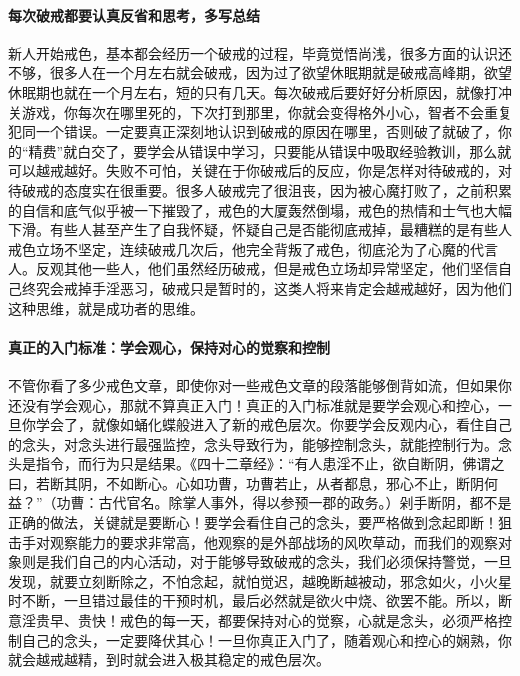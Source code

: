 \paragraph{每次破戒都要认真反省和思考，多写总结}

新人开始戒色，基本都会经历一个破戒的过程，毕竟觉悟尚浅，很多方面的认识还不够，很多人在一个月左右就会破戒，因为过了欲望休眠期就是破戒高峰期，欲望休眠期也就在一个月左右，短的只有几天。每次破戒后要好好分析原因，就像打冲关游戏，你每次在哪里死的，下次打到那里，你就会变得格外小心，智者不会重复犯同一个错误。一定要真正深刻地认识到破戒的原因在哪里，否则破了就破了，你的“精费”就白交了，要学会从错误中学习，只要能从错误中吸取经验教训，那么就可以越戒越好。失败不可怕，关键在于你破戒后的反应，你是怎样对待破戒的，对待破戒的态度实在很重要。很多人破戒完了很沮丧，因为被心魔打败了，之前积累的自信和底气似乎被一下摧毁了，戒色的大厦轰然倒塌，戒色的热情和士气也大幅下滑。有些人甚至产生了自我怀疑，怀疑自己是否能彻底戒掉，最糟糕的是有些人戒色立场不坚定，连续破戒几次后，他完全背叛了戒色，彻底沦为了心魔的代言人。反观其他一些人，他们虽然经历破戒，但是戒色立场却异常坚定，他们坚信自己终究会戒掉手淫恶习，破戒只是暂时的，这类人将来肯定会越戒越好，因为他们这种思维，就是成功者的思维。

\paragraph{真正的入门标准：学会观心，保持对心的觉察和控制}

不管你看了多少戒色文章，即使你对一些戒色文章的段落能够倒背如流，但如果你还没有学会观心，那就不算真正入门！真正的入门标准就是要学会观心和控心，一旦你学会了，就像如蛹化蝶般进入了新的戒色层次。你要学会反观内心，看住自己的念头，对念头进行最强监控，念头导致行为，能够控制念头，就能控制行为。念头是指令，而行为只是结果。《四十二章经》：“有人患淫不止，欲自断阴，佛谓之曰，若断其阴，不如断心。心如功曹，功曹若止，从者都息，邪心不止，断阴何益？”（功曹：古代官名。除掌人事外，得以参预一郡的政务。）剁手断阴，都不是正确的做法，关键就是要断心！要学会看住自己的念头，要严格做到念起即断！狙击手对观察能力的要求非常高，他观察的是外部战场的风吹草动，而我们的观察对象则是我们自己的内心活动，对于能够导致破戒的念头，我们必须保持警觉，一旦发现，就要立刻断除之，不怕念起，就怕觉迟，越晚断越被动，邪念如火，小火星时不断，一旦错过最佳的干预时机，最后必然就是欲火中烧、欲罢不能。所以，断意淫贵早、贵快！戒色的每一天，都要保持对心的觉察，心就是念头，必须严格控制自己的念头，一定要降伏其心！一旦你真正入门了，随着观心和控心的娴熟，你就会越戒越精，到时就会进入极其稳定的戒色层次。

